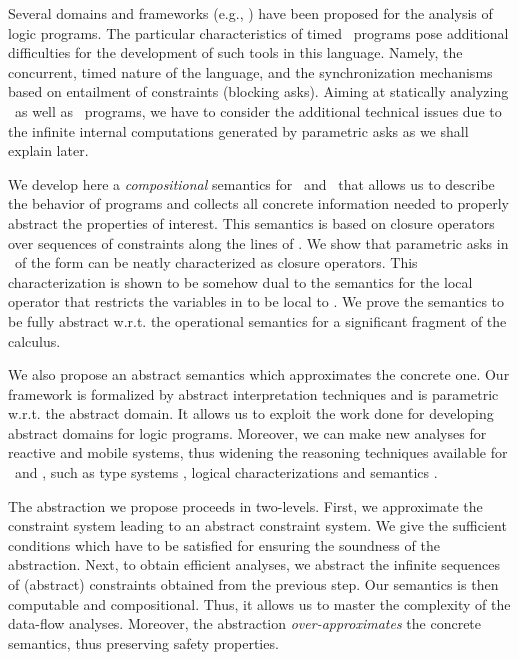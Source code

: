 \documentclass{tlp}
\begin{document}
Several domains and frameworks (e.g., \cite{CC92,armstrong98two,Codish99} )  
have been proposed  for the analysis of logic programs. The particular characteristics  of  timed \ccp\  programs  pose additional difficulties 
for the development of such tools in this language. Namely, 
 the concurrent, timed nature of the language, and the synchronization mechanisms based on  entailment of constraints (blocking asks). 
 Aiming at statically analyzing \utcc\ as well as \tccp\  programs, we have to  consider the additional technical issues due to  the infinite internal computations generated by parametric asks as we shall explain later.  
 
 
We develop here a \emph{compositional} semantics for \tccp\ and \utcc\ that 
allows us to describe the behavior of programs and collects all concrete 
information needed to properly abstract the properties of interest. This 
semantics is  based on closure operators over sequences of constraints  
along the lines of \cite{tcc-lics94}.  
We show that parametric asks in \utcc\ of the form    can 
be neatly characterized as  closure operators. This characterization is 
shown to be somehow dual to the semantics for the local operator 
 that restricts the variables in  to be local to . 
We  prove  the
 semantics  to be  fully 
 abstract w.r.t.  the operational semantics for a significant fragment of the  
 calculus.


We  also propose an abstract   semantics which approximates the  concrete one.  Our  framework is formalized by  abstract interpretation techniques and is  parametric w.r.t. 
 the abstract domain. It  allows us to exploit  the work done for developing abstract domains for 
 logic programs. Moreover, we can make new analyses for reactive 
 and mobile systems, thus widening the reasoning techniques   available for   \tccp\ and \utcc, such as 
type systems \cite{Lopez09}, logical characterizations \cite{MendlerPSS95,NPV02,Olarte:08:SAC} and semantics \cite{tcc-lics94,BoerPP95,NPV02}. 
 
 
The abstraction we propose proceeds in two-levels. First, we approximate the  
constraint system leading to an abstract constraint system. We give the sufficient 
conditions which 
have to be satisfied for ensuring the soundness of the abstraction. Next, to obtain efficient analyses, we abstract the infinite sequences of (abstract) constraints obtained from the previous step. Our semantics is then computable and compositional. Thus, it allows us to  master  the complexity of the data-flow analyses. Moreover, 
the  abstraction  \emph{over-approximates} the concrete semantics, thus preserving safety properties.
\end{document}
